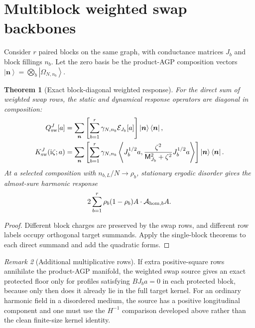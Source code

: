 \documentclass[11pt]{article}
\newtheorem{theorem}{Theorem}[section]
\theoremstyle{definition}
\theoremstyle{remark}
\newtheorem{remark}[theorem]{Remark}
\newcommand{\ket}[1]{\left|#1\right\rangle}
\newcommand{\bra}[1]{\left\langle#1\right|}
\newcommand{\I}{\mathrm i}
\newcommand{\cE}{\mathcal E}
\newcommand{\cA}{\mathcal A}
\newcommand{\ip}[2]{\left\langle #1,#2\right\rangle}
\begin{document}
\section{Multiblock weighted swap backbones}
\label{sec:multiblock}

Consider $r$ paired blocks on the same graph, with conductance matrices $J_b$ and block fillings $n_b$.  Let the zero basis be the product-AGP composition vectors
$\ket{\bm n}=\bigotimes_b\ket{\Omega_{N,n_b}}$.

\begin{theorem}[Exact block-diagonal weighted response]
\label{thm:multiblock}
For the direct sum of weighted swap rows, the static and dynamical response operators are diagonal in composition:
\begin{align}
 Q_{\rm sw}^{J}[a]
 &=\sum_{\bm n}\left[
 \sum_{b=1}^r\gamma_{N,n_b}\cE_{J_b}[a]
 \right]\ket{\bm n}\bra{\bm n},
 \label{eq:multiblock-static}\\
 K_{\rm sw}^{J}(\I\zeta;a)
 &=\sum_{\bm n}\left[
 \sum_{b=1}^r\gamma_{N,n_b}
 \ip{J_b^{1/2}a}
 {\frac{\zeta^2}{\mathsf M_{J_b}^2+\zeta^2}J_b^{1/2}a}
 \right]\ket{\bm n}\bra{\bm n}.
 \label{eq:multiblock-dynamic}
\end{align}
At a selected composition with $n_{b,L}/N\to\rho_b$, stationary ergodic disorder gives the almost-sure harmonic response
\begin{equation}
 2\sum_{b=1}^r\rho_b(1-\rho_b)
 A\cdot\cA_{{\rm hom},b}A.
 \label{eq:multiblock-hom}
\end{equation}
\end{theorem}

\begin{proof}
Different block charges are preserved by the swap rows, and different row labels occupy orthogonal target summands.  Apply the single-block theorems to each direct summand and add the quadratic forms.
\end{proof}

\begin{remark}[Additional multiplicative rows]
If extra positive-square rows annihilate the product-AGP manifold, the weighted swap source gives an exact protected floor only for profiles satisfying $BJ_ba=0$ in each protected block, because only then does it already lie in the full target kernel.  For an ordinary harmonic field in a disordered medium, the source has a positive longitudinal component and one must use the $H^{-1}$ comparison developed above rather than the clean finite-size kernel identity.
\end{remark}
\end{document}

